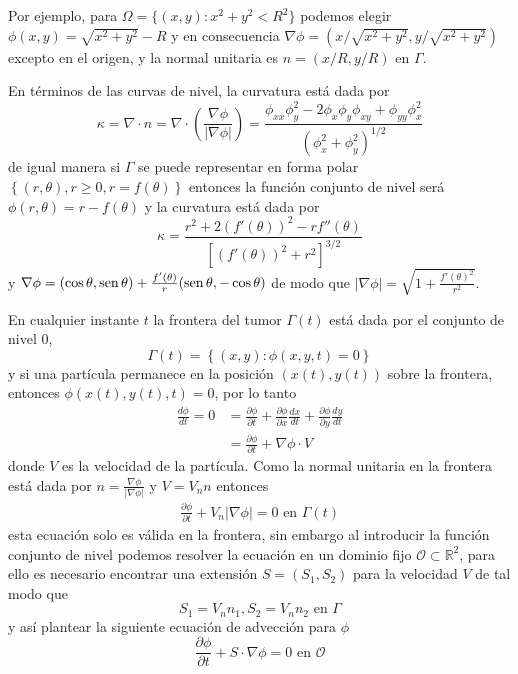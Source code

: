 Por ejemplo, para $\Omega=\{(x,y):x^2+y^2<R^2\}$ podemos elegir $\phi(x,y)=\sqrt{x^2+y^2}-R$ y en consecuencia  $\nabla\phi=(x/\sqrt{x^2+y^2},y/\sqrt{x^2+y^2})$ excepto en el origen, y la normal unitaria es $n=(x/R,y/R)$ en $\Gamma$.

En términos de las curvas de nivel, la curvatura está dada por
\[
\kappa = \nabla \cdot n = 
\nabla \cdot \left(\frac{\nabla \phi }{ |\nabla \phi |} \right)
=\frac{ \phi_{xx} \phi_{y}^2 - 2 \phi_{x} \phi_{y} \phi_{xy}
	+\phi_{yy} \phi_{x}^2  }{  ( \phi_{x}^2+ \phi_{y}^2   )^{1/2}}
\] 
de igual manera si $\Gamma$ se puede representar en forma polar $\left\{ (r,\theta),r\geq 0,r=f(\theta) \right\}$ entonces la función conjunto de nivel será $\phi(r,\theta) = r-f(\theta)$ y la curvatura está dada por
\[
\kappa =\frac{r^2 +2(f'(\theta))^2-rf''(\theta)}{
	\left[
	(f'(\theta))^2+r^2
	\right]^{3/2}
}
\]
y $
\nabla \phi =(\cos\theta,\operatorname{sen}\theta)+\frac{f'(\theta)}{r}(\operatorname{sen}\theta,-\cos\theta)$ de modo que $|\nabla \phi|=\sqrt{1+\frac{f'(\theta)^2}{r^2}}$.

En cualquier instante $t$ la frontera del tumor $\Gamma(t)$ está dada por el conjunto de nivel 0,
\[
\Gamma(t) =\left\{ (x,y): \phi(x,y,t)=0\right\}
\] y si una partícula permanece en la  posición $(x(t),y(t))$ sobre la frontera, entonces  $\phi(x(t),y(t),t)=0$, por lo tanto
\[
\begin{aligned}	
	\frac{d \phi}{dt}=0&= \frac{\partial \phi}{ \partial t}
	+\frac{\partial \phi}{ \partial x} \frac{d x}{dt}
	+\frac{\partial \phi}{ \partial y} \frac{d y}{dt}\\
	&=\frac{\partial \phi}{ \partial t}+\nabla \phi \cdot V
\end{aligned}
\]
donde $V$ es la velocidad de la partícula. Como 
la normal unitaria en la frontera está dada por $
n = \frac{\nabla \phi}{|\nabla \phi|}$ y $V=V_n n$  entonces
\[
\begin{aligned}	
	\frac{\partial \phi}{ \partial t}+V_n |\nabla \phi |=0\text{ en } \Gamma(t)
\end{aligned}
\]
esta ecuación solo es válida en la frontera, sin embargo al introducir la función conjunto de nivel podemos resolver la ecuación en un dominio fijo $\mathcal{O}\subset \mathbb{R}^{2}$, para ello es necesario encontrar una extensión $S=(S_1, S_2)$ para la velocidad $V$ de tal modo que 
\[
S_1 = V_n n_1, S_2 = V_n n_2\text{ en }\Gamma
\]
y así plantear la siguiente ecuación de advección para $\phi$
\begin{equation}
	\frac{\partial \phi}{ \partial t} + S \cdot \nabla \phi=0\text{ en } \mathcal{O}
	\label{eqn:evolucionconjuntodenivel}
\end{equation}
